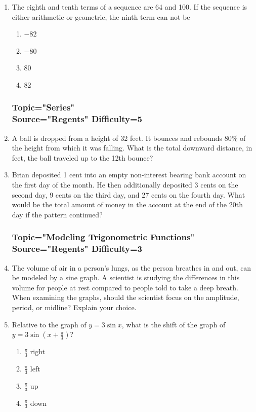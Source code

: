 \documentclass[12pt, oneside]{article}
\begin{document}
\begin{enumerate}
\item The eighth and tenth terms of a sequence are 64 and 100. If the sequence is either arithmetic or geometric, the ninth term can not be
\begin{enumerate}
    \item $-82$
    \item $-80$
    \item 80
    \item 82
\end{enumerate} %


\subsubsection*{Topic="Series"\\
Source="Regents" 
Difficulty=5}

\item A ball is dropped from a height of 32 feet. It bounces and rebounds 80\% of the height from which it was falling. What is the total downward distance, in feet, the ball traveled up to the 12th bounce? %

\item Brian deposited 1 cent into an empty non-interest bearing bank account on the first day of the month. He then additionally deposited 3 cents on the second day, 9 cents on the third day, and 27 cents on the fourth day. What would be the total amount of money in the account at the end of the 20th day if the pattern continued? %


\subsubsection*{Topic="Modeling Trigonometric Functions"\\
Source="Regents" 
Difficulty=3}

\item The volume of air in a person’s lungs, as the person breathes in and out, can be modeled by a sine graph. A scientist is studying the differences in this volume for people at rest compared to people told to take a deep breath. When examining the graphs, should the scientist focus on the amplitude, period, or midline? Explain your choice. %

\item Relative to the graph of $y=3\sin x$, what is the shift of the graph of $\displaystyle y=3\sin {(x+ \frac{\pi}{3})}$?
\begin{enumerate}
    \item $\frac{\pi}{3}$ right
    \item $\frac{\pi}{3}$ left
    \item $\frac{\pi}{3}$ up
    \item $\frac{\pi}{3}$ down
\end{enumerate} %



\end{enumerate}
\end{document}
